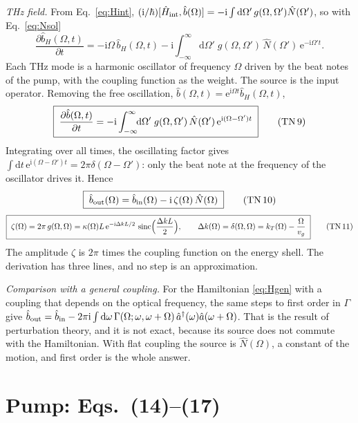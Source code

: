 \documentclass[aps,pra,onecolumn,notitlepage,11pt,amsmath,amssymb,nofootinbib]{revtex4-2}
\newcommand{\Nop}{\hat N}
\newcommand{\dd}{\mathrm{d}}
\newcommand{\ee}{\mathrm{e}}
\newcommand{\ii}{\mathrm{i}}
\newcommand{\sinc}{\operatorname{sinc}}
\newcommand{\TN}[1]{\text{TN\,#1}}
\begin{document}
\emph{THz field.} From Eq.~\eqref{eq:Hint},
$(\ii/\hbar)[\hat H_{\rm int},\hat b(\Omega)]
=-\ii\int\dd\Omega'\,g(\Omega,\Omega')\Nop(\Omega')$, so with
Eq.~\eqref{eq:Nsol}
\begin{equation}
\frac{\partial\hat b_H(\Omega,t)}{\partial t}=-\ii\Omega\,\hat b_H(\Omega,t)
-\ii\int_{-\infty}^{\infty}\!\!\dd\Omega'\;g(\Omega,\Omega')\,\Nop(\Omega')\,\ee^{-\ii\Omega't}.
\label{eq:bH}
\end{equation}
Each THz mode is a harmonic oscillator of frequency $\Omega$ driven by the
beat notes of the pump, with the coupling function as the weight. The source
is the input operator. Removing the free oscillation,
$\hat b(\Omega,t)=\ee^{\ii\Omega t}\hat b_H(\Omega,t)$,
\begin{equation}
\boxed{\;\frac{\partial\hat b(\Omega,t)}{\partial t}
=-\ii\int_{-\infty}^{\infty}\!\!\dd\Omega'\;g(\Omega,\Omega')\,\Nop(\Omega')\,\ee^{\ii(\Omega-\Omega')t}\;}
\tag{\TN{9}}
\end{equation}
Integrating over all times, the oscillating factor gives
$\int\dd t\,\ee^{\ii(\Omega-\Omega')t}=2\pi\delta(\Omega-\Omega')$: only the
beat note at the frequency of the oscillator drives it. Hence
\begin{equation}
\boxed{\;\hat b_{\rm out}(\Omega)=\hat b_{\rm in}(\Omega)-\ii\,\zeta(\Omega)\,\Nop(\Omega)\;}
\tag{\TN{10}}
\end{equation}
\begin{equation}
\boxed{\;\zeta(\Omega)=2\pi\,g(\Omega,\Omega)
=\kappa(\Omega)L\,\ee^{-\ii\Delta kL/2}\,\sinc\!\Big(\frac{\Delta kL}{2}\Big),
\qquad\Delta k(\Omega)=\delta(\Omega,\Omega)=k_T(\Omega)-\frac{\Omega}{v_g}\;}
\tag{\TN{11}}
\label{eq:onshell}
\end{equation}
The amplitude $\zeta$ is $2\pi$ times the coupling function on the energy
shell. The derivation has three lines, and no step is an approximation.

\emph{Comparison with a general coupling.} For the Hamiltonian
\eqref{eq:Hgen} with a coupling that depends on the optical frequency, the
same steps to first order in $\Gamma$ give
$\hat b_{\rm out}=\hat b_{\rm in}
-2\pi\ii\int\dd\omega\,\Gamma(\Omega;\omega,\omega+\Omega)\,
\hat a^\dagger(\omega)\hat a(\omega+\Omega)$. That is the result of perturbation
theory, and it is not exact, because its source does not commute with the
Hamiltonian. With flat coupling the source is $\Nop(\Omega)$, a constant of
the motion, and first order is the whole answer.

\section{Pump: Eqs.~(14)--(17)}
\label{sec:pump}
\end{document}
